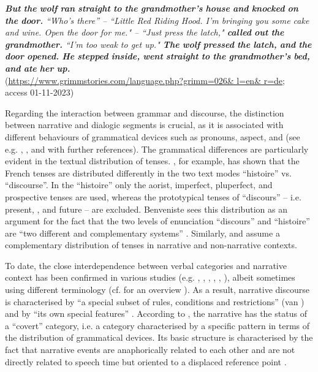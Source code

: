 \documentclass[output=paper,colorlinks,citecolor=brown]{langscibook}
\begin{document}
\ea%
\label{ex:zeman:1}
{\itshape \textbf{But} \textbf{the} \textbf{wolf} \textbf{ran} \textbf{straight} \textbf{to} \textbf{the} \textbf{grandmother's} \textbf{house} \textbf{and} \textbf{knocked} \textbf{on} \textbf{the} \textbf{door.} “Who's there'' – “Little Red Riding Hood. I'm bringing you some cake and wine. Open the door for me." – “Just press the latch," \textbf{called} \textbf{out} \textbf{the} \textbf{grandmother.} “I'm too weak to get up." \textbf{The} \textbf{wolf} \textbf{pressed} \textbf{the} \textbf{latch,} \textbf{and} \textbf{the} \textbf{door} \textbf{opened.} \textbf{He} \textbf{stepped} \textbf{inside,} \textbf{went} \textbf{straight} \textbf{to} \textbf{the} \textbf{grandmother's} \textbf{bed,} \textbf{and} \textbf{ate} \textbf{her} \textbf{up.}}\\
\hfill (\url{https://www.grimmstories.com/language.php?grimm=026\& l=en\& r=de}; \\
\hfill access 01-11-2023)\\
\z
 
Regarding the interaction between grammar and discourse, the distinction between narrative and dialogic segments is crucial, as it is associated with different behaviours of grammatical devices such as pronouns, aspect, and  (see e.g. \citealt{MazziottaGlikman2019}, \citealt{EgbertMahlberg2020}, and \citealt[2]{Larrivée2022} with further references). The grammatical differences are particularly evident in the textual distribution of tenses. \citet[264]{benviste1972}, for example, has shown that the French tenses are distributed differently in the two text modes “histoire” vs. “discourse”. In the “histoire” only the aorist, imperfect, pluperfect, and prospective tenses are used, whereas the prototypical tenses of “discours” – i.e. present, , and future – are excluded. Benveniste sees this distribution as an argument for the fact that the two levels of enunciation
“discours” and “histoire” are “two different and complementary systems” \citep[266]{benviste1972}. Similarly, \citet{Weinrich1964} and \citet{Hamburger1957} assume a complementary distribution of tenses in narrative and non-narrative contexts.

To date, the close interdependence between verbal categories and narrative context has been confirmed in various studies (e.g. \citealt{Dahl1985}, \citealt{Fleischman1990}, \citealt{Smith2003}, \citealt{Zeman2010}, \citealt{Padučeva2011}, \citealt{Fischer2020}), albeit sometimes using different terminology (cf. for an overview \citealt[461--466]{Zeman2020}). As a result, narrative discourse is characterised by “a special subset of rules, conditions and restrictions” (van \citealt[289]{Dijk2015}) and by “its own special features” \citep[9]{Padučeva2011}. According to \citet{Smith2003}, the narrative  has the status of a “covert” category, i.e. a category characterised by a specific pattern in terms of the distribution of grammatical devices. Its basic structure is characterised by the fact that narrative events are anaphorically related to each other and are not directly related to speech time but oriented to a displaced reference point \citep[13]{Smith2003}.
\end{document}
